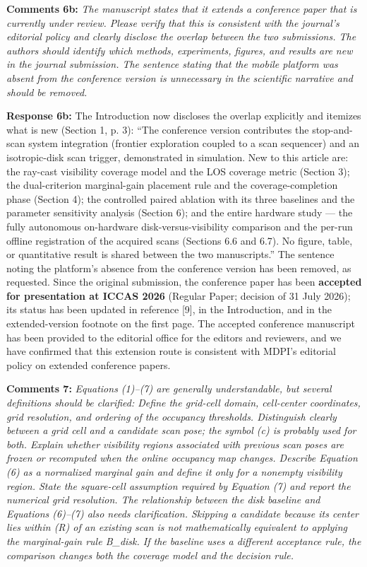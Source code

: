 \documentclass[11pt]{article}
\begin{document}
\medskip

\textbf{Comments 6b:} \emph{The manuscript states that it extends a conference paper that is currently under review. Please verify that this is consistent with the journal’s editorial policy and clearly disclose the overlap between the two submissions. The authors should identify which methods, experiments, figures, and results are new in the journal submission. The sentence stating that the mobile platform was absent from the conference version is unnecessary in the scientific narrative and should be removed.}

\textbf{Response 6b:} The Introduction now discloses the overlap explicitly and itemizes what is new (Section 1, p. 3):
“The conference version contributes the stop-and-scan system integration (frontier exploration coupled to a scan sequencer) and an isotropic-disk scan trigger, demonstrated in simulation. New to this article are: the ray-cast visibility coverage model and the LOS coverage metric (Section 3); the dual-criterion marginal-gain placement rule and the coverage-completion phase (Section 4); the controlled paired ablation with its three baselines and the parameter sensitivity analysis (Section 6); and the entire hardware study — the fully autonomous on-hardware disk-versus-visibility comparison and the per-run offline registration of the acquired scans (Sections 6.6 and 6.7). No figure, table, or quantitative result is shared between the two manuscripts.”
The sentence noting the platform’s absence from the conference version has been removed, as requested. Since the original submission, the conference paper has been \textbf{accepted for presentation at ICCAS 2026} (Regular Paper; decision of 31 July 2026); its status has been updated in reference [9], in the Introduction, and in the extended-version footnote on the first page. The accepted conference manuscript has been provided to the editorial office for the editors and reviewers, and we have confirmed that this extension route is consistent with MDPI’s editorial policy on extended conference papers.

\medskip

\textbf{Comments 7:} \emph{Equations (1)–(7) are generally understandable, but several definitions should be clarified: Define the grid-cell domain, cell-center coordinates, grid resolution, and ordering of the occupancy thresholds. Distinguish clearly between a grid cell and a candidate scan pose; the symbol (c) is probably used for both. Explain whether visibility regions associated with previous scan poses are frozen or recomputed when the online occupancy map changes. Describe Equation (6) as a normalized marginal gain and define it only for a nonempty visibility region. State the square-cell assumption required by Equation (7) and report the numerical grid resolution. The relationship between the disk baseline and Equations (6)–(7) also needs clarification. Skipping a candidate because its center lies within (R) of an existing scan is not mathematically equivalent to applying the marginal-gain rule B\_disk. If the baseline uses a different acceptance rule, the comparison changes both the coverage model and the decision rule.}
\end{document}
